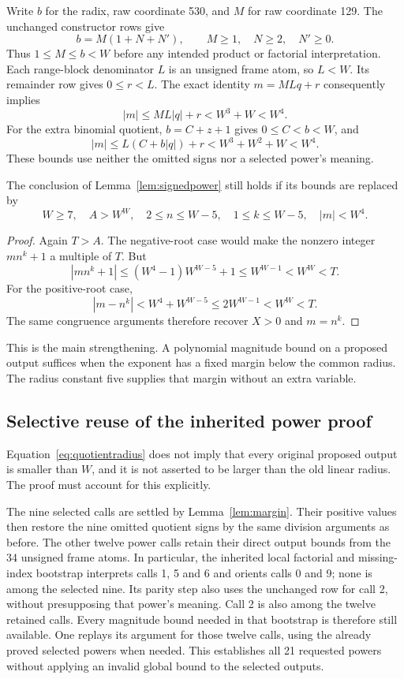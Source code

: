 Write \(b\) for the radix, raw coordinate 530, and \(M\) for raw coordinate 129. The unchanged constructor rows give
\[
b=M(1+N+N'),\qquad M\ge1,\quad N\ge2,\quad N'\ge0.
\]
Thus \(1\le M\le b<W\) before any intended product or factorial interpretation. Each range-block denominator \(L\) is an unsigned frame atom, so \(L<W\). Its remainder row gives \(0\le r<L\). The exact identity \(m=MLq+r\) consequently implies
\[
|m|\le ML|q|+r<W^3+W<W^4.
\]
For the extra binomial quotient, \(b=C+z+1\) gives \(0\le C<b<W\), and
\[
|m|\le L(C+b|q|)+r<W^3+W^2+W<W^4.
\]
These bounds use neither the omitted signs nor a selected power's meaning.

\begin{lemma}\label{lem:margin}
The conclusion of Lemma~\ref{lem:signedpower} still holds if its bounds are replaced by
\[
W\ge7,\quad A>W^W,\quad 2\le n\le W-5,\quad
1\le k\le W-5,\quad |m|<W^4.
\]
\end{lemma}
\begin{proof}
Again \(T>A\). The negative-root case would make the nonzero integer \(mn^k+1\) a multiple of \(T\). But
\[
|mn^k+1|\le(W^4-1)W^{W-5}+1
\le W^{W-1}<W^W<T.
\]
For the positive-root case,
\[
|m-n^k|<W^4+W^{W-5}\le2W^{W-1}<W^W<T.
\]
The same congruence arguments therefore recover \(X>0\) and \(m=n^k\).
\end{proof}

This is the main strengthening. A polynomial magnitude bound on a proposed output suffices when the exponent has a fixed margin below the common radius. The radius constant five supplies that margin without an extra variable.

\subsection{Selective reuse of the inherited power proof}

Equation~\eqref{eq:quotientradius} does not imply that every original proposed output is smaller than \(W\), and it is not asserted to be larger than the old linear radius. The proof must account for this explicitly.

The nine selected calls are settled by Lemma~\ref{lem:margin}. Their positive values then restore the nine omitted quotient signs by the same division arguments as before. The other twelve power calls retain their direct output bounds from the 34 unsigned frame atoms. In particular, the inherited local factorial and missing-index bootstrap interprets calls 1, 5 and 6 and orients calls 0 and 9; none is among the selected nine. Its parity step also uses the unchanged row for call 2, without presupposing that power's meaning. Call 2 is also among the twelve retained calls. Every magnitude bound needed in that bootstrap is therefore still available. One replays its argument for those twelve calls, using the already proved selected powers when needed. This establishes all 21 requested powers without applying an invalid global bound to the selected outputs.

